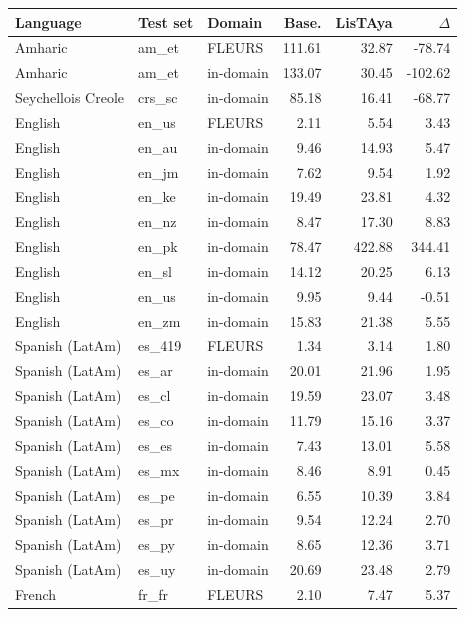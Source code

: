 \begin{table}[t]
\centering
\setlength{\tabcolsep}{4pt}
\begin{tabular}{@{}lllrrr@{}}
\toprule
\textbf{Language} & \textbf{Test set} & \textbf{Domain} & \textbf{Base.} & \textbf{LisTAya} & \textbf{$\Delta$} \\
\midrule
Amharic & am\_et & FLEURS & 111.61 & 32.87 & -78.74 \\
Amharic & am\_et & in-domain & 133.07 & 30.45 & -102.62 \\
Seychellois Creole & crs\_sc & in-domain & 85.18 & 16.41 & -68.77 \\
English & en\_us & FLEURS & 2.11 & 5.54 & 3.43 \\
English & en\_au & in-domain & 9.46 & 14.93 & 5.47 \\
English & en\_jm & in-domain & 7.62 & 9.54 & 1.92 \\
English & en\_ke & in-domain & 19.49 & 23.81 & 4.32 \\
English & en\_nz & in-domain & 8.47 & 17.30 & 8.83 \\
English & en\_pk & in-domain & 78.47 & 422.88 & 344.41 \\
English & en\_sl & in-domain & 14.12 & 20.25 & 6.13 \\
English & en\_us & in-domain & 9.95 & 9.44 & -0.51 \\
English & en\_zm & in-domain & 15.83 & 21.38 & 5.55 \\
Spanish (LatAm) & es\_419 & FLEURS & 1.34 & 3.14 & 1.80 \\
Spanish (LatAm) & es\_ar & in-domain & 20.01 & 21.96 & 1.95 \\
Spanish (LatAm) & es\_cl & in-domain & 19.59 & 23.07 & 3.48 \\
Spanish (LatAm) & es\_co & in-domain & 11.79 & 15.16 & 3.37 \\
Spanish (LatAm) & es\_es & in-domain & 7.43 & 13.01 & 5.58 \\
Spanish (LatAm) & es\_mx & in-domain & 8.46 & 8.91 & 0.45 \\
Spanish (LatAm) & es\_pe & in-domain & 6.55 & 10.39 & 3.84 \\
Spanish (LatAm) & es\_pr & in-domain & 9.54 & 12.24 & 2.70 \\
Spanish (LatAm) & es\_py & in-domain & 8.65 & 12.36 & 3.71 \\
Spanish (LatAm) & es\_uy & in-domain & 20.69 & 23.48 & 2.79 \\
French & fr\_fr & FLEURS & 2.10 & 7.47 & 5.37 \\

\end{tabular}
\end{table}
